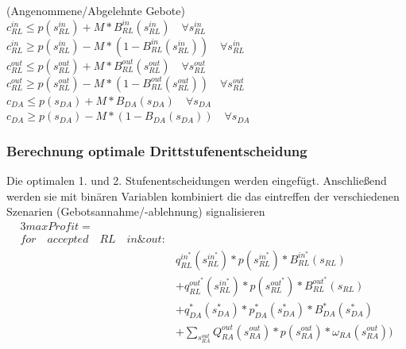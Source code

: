 \documentclass{article}
\begin{document}
(Angenommene/Abgelehnte Gebote)\\
$c^{in}_{RL} \leq p(s^{in}_{RL}) + M * B^{in}_{RL}(s^{in}_{RL})\quad\forall s^{in}_{RL} $ \\
$c^{in}_{RL} \geq p(s^{in}_{RL}) - M * (1 - B^{in}_{RL}(s^{in}_{RL}))\quad\forall s^{in}_{RL} $ \\
$c^{out}_{RL} \leq p(s^{out}_{RL}) + M * B^{out}_{RL}(s^{out}_{RL})\quad\forall s^{out}_{RL} $ \\
$c^{out}_{RL} \geq p(s^{out}_{RL}) - M * (1 - B^{out}_{RL}(s^{out}_{RL}))\quad\forall s^{out}_{RL} $ \\
$c_{DA} \leq p(s_{DA}) + M * B_{DA}(s_{DA})\quad\forall s_{DA} $ \\
$c_{DA} \geq p(s_{DA}) - M * (1 - B_{DA}(s_{DA}))\quad\forall s_{DA} $ \\



\subsubsection{Berechnung optimale Drittstufenentscheidung}
Die optimalen 1. und 2. Stufenentscheidungen werden eingefügt. Anschließend werden sie mit binären Variablen kombiniert die das eintreffen der verschiedenen Szenarien (Gebotsannahme/-ablehnung) signalisieren
\begin{alignat*}{3}  
max Profit  =&\\
for\quad accepted\quad RL\quad in \& out:&\\
        &q^{in^*}_{RL} (s^{in^*}_{RL}) * p(s^{in^*}_{RL}) * B^{in^*}_{RL} (s_{RL}) \\
        &+ q^{out^*}_{RL}(s^{in^*}_{RL}) * p(s^{out^*}_{RL}) * B^{out^*}_{RL} (s_{RL})\\    
        &+ q^*_{DA}(s^*_{DA}) * p^*_{DA}(s^*_{DA}) * B^*_{DA}(s^*_{DA})\\
	&	+ \sum_{s^{out}_{RA}} Q^{out}_{RA}(s^{out}_{RA}) * p(s^{out}_{RA}) * \omega_{RA}(s^{out}_{RA}) \Biggr) \\
\end{alignat*}
\end{document}
